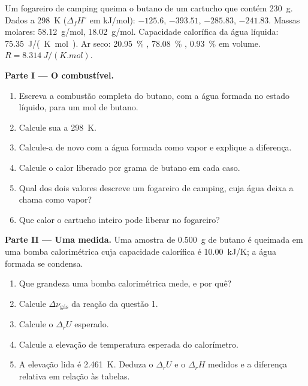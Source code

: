 \begin{problem}
\label{pb:b2:reaction-enthalpy:1}
Um fogareiro de camping queima o butano de um cartucho que contém \qty{230}{g}.
Dados a \qty{298}{K} ($\Delta_f H^\circ$ em \unit{kJ/mol}): 
$-125.6$,  $-393.51$,  $-285.83$, 
$-241.83$. Massas molares:  \qty{58.12}{g/mol}, 
\qty{18.02}{g/mol}. Capacidade calorífica da água líquida:
\qty{75.35}{J/(K.mol)}. Ar seco: \qty{20.95}{\percent} ,
\qty{78.08}{\percent} , \qty{0.93}{\percent}  em volume. $R = \qty{8.314}{J/(K.mol)}$.

\medskip
\noindent\textbf{Parte I --- O combustível.}
\begin{enumerate}
  \item Escreva a combustão completa do butano, com a água formada no
        estado líquido, para um mol de butano.
  \item Calcule sua  a \qty{298}{K}.
  \item Calcule-a de novo com a água formada como vapor e explique a
        diferença.
  \item Calcule o calor liberado por grama de butano em cada caso.
  \item Qual dos dois valores descreve um fogareiro de camping, cuja água
        deixa a chama como vapor?
  \item Que calor o cartucho inteiro pode liberar no fogareiro?
\end{enumerate}

\medskip
\noindent\textbf{Parte II --- Uma medida.}
Uma amostra de \qty{0.500}{g} de butano é queimada em uma bomba
calorimétrica cuja capacidade calorífica é \qty{10.00}{kJ/K}; a água
formada se condensa.
\begin{enumerate}[resume]
  \item Que grandeza uma bomba calorimétrica mede, e por quê?
  \item Calcule $\Delta\nu_{\text{gás}}$ da reação da questão 1.
  \item Calcule o $\Delta_r U$ esperado.
  \item Calcule a elevação de temperatura esperada do calorímetro.
  \item A elevação lida é \qty{2.461}{K}. Deduza o $\Delta_r U$ e o
        $\Delta_r H$ medidos e a diferença relativa em relação às tabelas.
\end{enumerate}


\end{problem}
